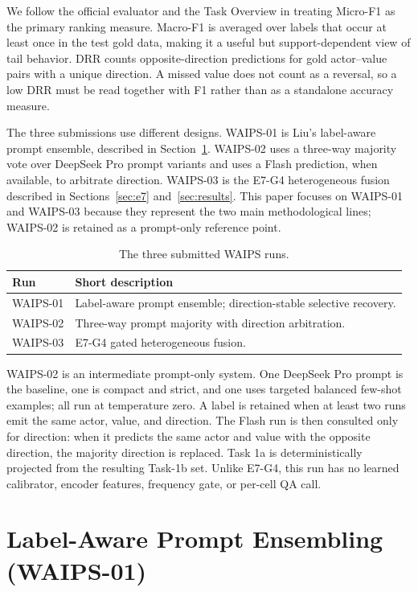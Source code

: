 \documentclass[sigconf,article,a4paper]{acmart}
\begin{document}
We follow the official evaluator and the Task Overview \cite{wangFehu2026} in treating Micro-F1 as
the primary ranking measure. Macro-F1 is averaged over labels that occur at
least once in the test gold data, making it a useful but support-dependent view
of tail behavior. DRR counts opposite-direction predictions for gold
actor--value pairs with a unique direction. A missed value does not count as a
reversal, so a low DRR must be read together with F1 rather than as a standalone
accuracy measure.

The three submissions use different designs. WAIPS-01 is Liu's
label-aware prompt ensemble, described in Section~\ref{sec:liu}. WAIPS-02 uses
a three-way majority vote over DeepSeek Pro prompt variants and uses a Flash
prediction, when available, to arbitrate direction. WAIPS-03 is the E7-G4
heterogeneous fusion described in Sections~\ref{sec:e7} and~\ref{sec:results}.
This paper focuses on WAIPS-01 and WAIPS-03 because they represent the two main
methodological lines; WAIPS-02 is retained as a prompt-only reference
point.

\begin{table}[H]
  \caption{The three submitted WAIPS runs.}
  \label{tab:runs}
  \small
  \begin{tabularx}{\columnwidth}{@{}lX@{}}
    \toprule
    Run & Short description \\
    \midrule
    WAIPS-01 & Label-aware prompt ensemble; direction-stable selective recovery. \\
    WAIPS-02 & Three-way prompt majority with direction arbitration. \\
    WAIPS-03 & E7-G4 gated heterogeneous fusion. \\
    \bottomrule
  \end{tabularx}
\end{table}

WAIPS-02 is an intermediate prompt-only system. One
DeepSeek Pro prompt is the baseline, one is compact and strict, and one uses
targeted balanced few-shot examples; all run at temperature zero. A label is retained
when at least two runs emit the same actor, value, and direction.
The Flash run is then consulted only for direction: when it predicts the same
actor and value with the opposite direction, the majority direction is
replaced. Task 1a is deterministically projected from the resulting Task-1b
set. Unlike E7-G4, this run has no learned calibrator, encoder features,
frequency gate, or per-cell QA call.

\section{Label-Aware Prompt Ensembling (WAIPS-01)}
\label{sec:liu}
\end{document}
